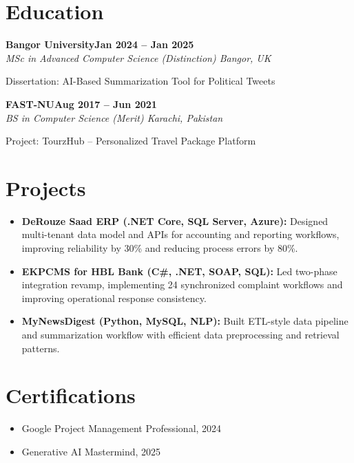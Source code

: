\documentclass[letterpaper,10pt]{article}
\newcommand{\headingBf}[2]{
  \hspace{10pt}\textbf{#1}\hfill\textbf{#2}\\
}
\newcommand{\headingIt}[2]{
  \hspace{10pt}\textit{#1}\hfill\textit{#2}\\
}
\newenvironment{resume_list}{
  \vspace{-7pt}
  \begin{itemize}[itemsep=-2px, parsep=1pt, leftmargin=30pt]
}{
  \end{itemize}
}
\begin{document}
\section{Education}

\headingBf{Bangor University}{Jan 2024 -- Jan 2025}
\headingIt{MSc in Advanced Computer Science (Distinction) \hfill Bangor, UK}{}
\begin{resume_list}
    \item Dissertation: AI-Based Summarization Tool for Political Tweets
\end{resume_list}

\headingBf{FAST-NU}{Aug 2017 -- Jun 2021}
\headingIt{BS in Computer Science (Merit) \hfill Karachi, Pakistan}{}
\begin{resume_list}
    \item Project: TourzHub -- Personalized Travel Package Platform
\end{resume_list}

\section{Projects}
\begin{itemize}
    \setlength\itemsep{3pt}
    \item \textbf{DeRouze Saad ERP (.NET Core, SQL Server, Azure):} Designed multi-tenant data model and APIs for accounting and reporting workflows, improving reliability by 30\% and reducing process errors by 80\%.
    \item \textbf{EKPCMS for HBL Bank (C\#, .NET, SOAP, SQL):} Led two-phase integration revamp, implementing 24 synchronized complaint workflows and improving operational response consistency.
    \item \textbf{MyNewsDigest (Python, MySQL, NLP):} Built ETL-style data pipeline and summarization workflow with efficient data preprocessing and retrieval patterns.
\end{itemize}

\section{Certifications}
\begin{itemize}
    \item Google Project Management Professional, 2024
    \item Generative AI Mastermind, 2025
\end{itemize}

\vspace*{\fill}
\end{document}
